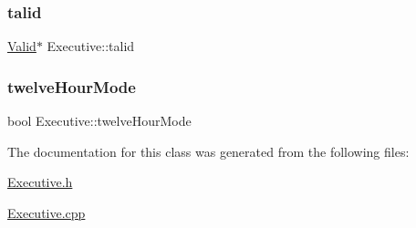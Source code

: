 \subsubsection{\texorpdfstring{talid}{talid}}
{\footnotesize\ttfamily \hyperlink{class_valid}{Valid}$\ast$ Executive\+::talid\hspace{0.3cm}{\ttfamily [private]}}

\mbox{\label{class_executive_a0d8c5ac39b849ace6ba439edbec23d26}} 
\subsubsection{\texorpdfstring{twelve\+Hour\+Mode}{twelveHourMode}}
{\footnotesize\ttfamily bool Executive\+::twelve\+Hour\+Mode\hspace{0.3cm}{\ttfamily [private]}}



The documentation for this class was generated from the following files\+:\begin{DoxyCompactItemize}
\item 
\hyperlink{_executive_8h}{Executive.\+h}\item 
\hyperlink{_executive_8cpp}{Executive.\+cpp}\end{DoxyCompactItemize}

